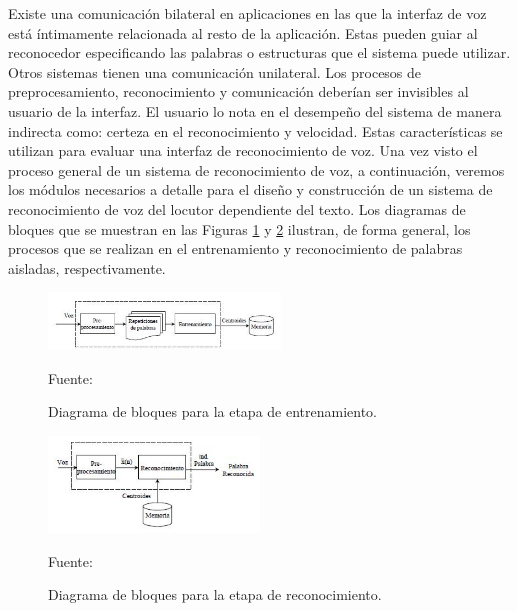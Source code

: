 Existe una comunicación bilateral en aplicaciones en las que la interfaz de voz está íntimamente relacionada al resto de la aplicación. Estas pueden guiar al reconocedor especificando las palabras o estructuras que el sistema puede utilizar. Otros sistemas tienen una comunicación unilateral.
\vskip 0.5cm
Los procesos de preprocesamiento, reconocimiento y comunicación deberían ser invisibles al usuario de la interfaz. El usuario lo nota en el desempeño del sistema de manera indirecta como: certeza en el reconocimiento y velocidad. Estas características se utilizan para evaluar una interfaz de reconocimiento de voz.
\vskip 0.5cm
Una vez visto el proceso general de un sistema de reconocimiento de voz, a continuación, veremos los módulos necesarios a detalle para el diseño y construcción de un sistema de reconocimiento de voz del locutor dependiente del texto. 
\vskip 0.5cm
Los diagramas de bloques que se muestran en las Figuras \ref{fig:figura2.5} y \ref{fig:figura2.6} ilustran, de forma general, los procesos que se realizan en el entrenamiento y reconocimiento de palabras aisladas, respectivamente.

\begin{figure}[ht]
\begin{center}
\includegraphics[width=0.55\textwidth]{Imagenes/Cap2/image005}
\end{center}
\begin{center}
\vskip -0.5cm
\caption{\small{Diagrama de bloques para la etapa de entrenamiento.}}
\label{fig:figura2.5}
{\small{Fuente: \cite{navarrete}}}
\end{center}
\end{figure}

\begin{figure}[ht]
\begin{center}
\includegraphics[width=0.5\textwidth]{Imagenes/Cap2/image006}
\end{center}
\begin{center}
\vskip -0.5cm
\caption{\small{Diagrama de bloques para la etapa de reconocimiento.}}
\label{fig:figura2.6}
{\small{Fuente: \cite{navarrete}}}
\end{center}
\end{figure}

